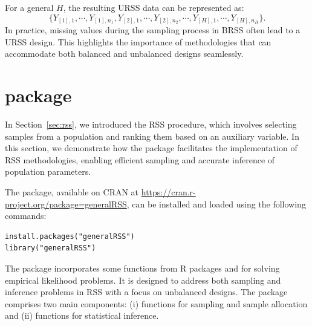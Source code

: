 For a general $H$, the resulting URSS data can be represented as:
\[\{Y_{[1],1},\cdots, Y_{[1],n_1}, Y_{[2],1}, \cdots, Y_{[2],n_2}, \cdots, Y_{[H],1},\cdots, Y_{[H],n_H}\}.\]
In practice, missing values during the sampling process in BRSS often lead to a URSS design. This highlights the importance of methodologies that can accommodate both balanced and unbalanced designs seamlessly.

\section[generalRSS package]{ package}

In Section~\ref{sec:rss}, we introduced the RSS procedure, which involves selecting samples from a population and ranking them based on an auxiliary variable. In this section, we demonstrate how the  package facilitates the implementation of RSS methodologies, enabling efficient sampling and accurate inference of population parameters.

The  package, available on CRAN at \url{https://cran.r-project.org/package=generalRSS}, can be installed and loaded using the following commands:
%
\begin{verbatim}
install.packages("generalRSS")
library("generalRSS")
\end{verbatim}
%

The package incorporates some functions from R packages  \citep{emplik} and  \citep{rootSolve} for solving empirical likelihood problems. It is designed to address both sampling and inference problems in RSS with a focus on unbalanced designs. The package comprises two main components: (i) functions for sampling and sample allocation and (ii) functions for statistical inference.

